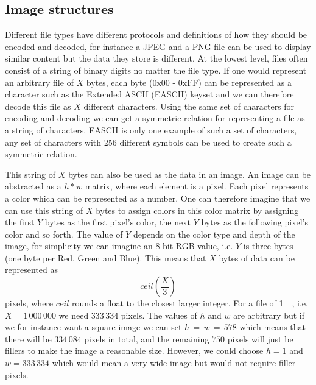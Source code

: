 \subsection{Image structures}
Different file types have different protocols and definitions of how they should be encoded and decoded, for instance a JPEG and a PNG file can be used to display similar content but the data they store is different. At the lowest level, files often consist of a string of binary digits no matter the file type. If one would represent an arbitrary file of $X$ bytes, each byte (0x00 - 0xFF) can be represented as a character such as the Extended ASCII (EASCII) keyset and we can therefore decode this file as $X$ different characters. Using the same set of characters for encoding and decoding we can get a symmetric relation for representing a file as a string of characters. EASCII is only one example of such a set of characters, any set of characters with 256 different symbols can be used to create such a symmetric relation.

This string of $X$ bytes can also be used as the data in an image. An image can be abstracted as a $h * w$ matrix, where each element is a pixel. Each pixel represents a color which can be represented as a number. One can therefore imagine that we can use this string of $X$ bytes to assign colors in this color matrix by assigning the first $Y$ bytes as the first pixel's color, the next $Y$ bytes as the following pixel's color and so forth. The value of $Y$ depends on the color type and depth of the image, for simplicity we can imagine an 8-bit RGB value, i.e. $Y$ is three bytes (one byte per Red, Green and Blue). This means that $X$ bytes of data can be represented as 
$$ceil(\frac{X}{3})$$ 
pixels, where $ceil$ rounds a float to the closest larger integer. For a file of \SI{1}{\mega\byte}, i.e. $X = 1\,000\,000$ we need $333\,334$ pixels. The values of $h$ and $w$ are arbitrary but if we for instance want a square image we can set $ h\,=\,w\,=\,578$ which means that there will be $334\,084$ pixels in total, and the remaining $750$ pixels will just be fillers to make the image a reasonable size. However, we could choose $h = 1$ and $w = 333\,334$ which would mean a very wide image but would not require filler pixels.